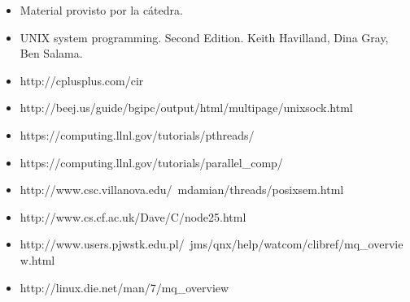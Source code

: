 \documentclass[a4paper,10pt]{article}
\begin{document}
\begin{itemize}
  \item Material provisto por la cátedra.
  \item UNIX system programming. Second Edition. Keith Havilland, Dina Gray, Ben Salama.
  \item http://cplusplus.com/cir
  \item http://beej.us/guide/bgipc/output/html/multipage/unixsock.html
  \item https://computing.llnl.gov/tutorials/pthreads/
  \item https://computing.llnl.gov/tutorials/parallel\_comp/
  \item http://www.csc.villanova.edu/~mdamian/threads/posixsem.html
  \item http://www.cs.cf.ac.uk/Dave/C/node25.html
  \item http://www.users.pjwstk.edu.pl/~jms/qnx/help/watcom/clibref/mq\_overview.html
  \item http://linux.die.net/man/7/mq\_overview
\end{itemize}
   
\end{document}
